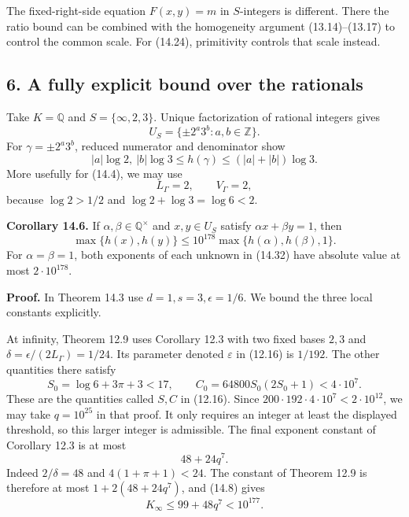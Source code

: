 \documentclass[
  11pt,
  a4paper,
]{article}
\begin{document}
The fixed-right-side equation \(F(x,y)=m\) in \(S\)-integers is
different. There the ratio bound can be combined with the homogeneity
argument (13.14)--(13.17) to control the common scale. For (14.24),
primitivity controls that scale instead.

\subsection{6. A fully explicit bound over the
rationals}\label{a-fully-explicit-bound-over-the-rationals}

Take \(K=\mathbb Q\) and \(S=\{\infty,2,3\}\). Unique factorization of
rational integers gives \[
U_S=\{\pm2^a3^b:a,b\in\mathbb Z\}.
\tag{14.32}
\] For \(\gamma=\pm2^a3^b\), reduced numerator and denominator show \[
|a|\log2,\ |b|\log3\le h(\gamma)
 \le(|a|+|b|)\log3.
\] More usefully for (14.4), we may use \[
L_\Gamma=2,\qquad V_\Gamma=2,
\tag{14.33}
\] because \(\log2>1/2\) and \(\log2+\log3=\log6<2\).

\textbf{Corollary 14.6.} If \(\alpha,\beta\in\mathbb Q^\times\) and
\(x,y\in U_S\) satisfy \(\alpha x+\beta y=1\), then \[
\max\{h(x),h(y)\}\le
10^{178}\max\{h(\alpha),h(\beta),1\}.
\tag{14.34}
\] For \(\alpha=\beta=1\), both exponents of each unknown in (14.32)
have absolute value at most \(2\cdot10^{178}\).

\textbf{Proof.} In Theorem 14.3 use \(d=1,s=3,\epsilon=1/6\). We bound
the three local constants explicitly.

At infinity, Theorem 12.9 uses Corollary 12.3 with two fixed bases
\(2,3\) and \(\delta=\epsilon/(2L_\Gamma)=1/24\). Its parameter denoted
\(\varepsilon\) in (12.16) is \(1/192\). The other quantities there
satisfy \[
S_0=\log6+3\pi+3<17,\qquad
C_0=64800S_0(2S_0+1)<4\cdot10^7.
\tag{14.35}
\] These are the quantities called \(S,C\) in (12.16). Since
\(200\cdot192\cdot4\cdot10^7<2\cdot10^{12}\), we may take \(q=10^{25}\)
in that proof. It only requires an integer at least the displayed
threshold, so this larger integer is admissible. The final exponent
constant of Corollary 12.3 is at most \[
48+24q^7.
\tag{14.36}
\] Indeed \(2/\delta=48\) and \(4(1+\pi+1)<24\). The constant of Theorem
12.9 is therefore at most \(1+2(48+24q^7)\), and (14.8) gives \[
K_\infty\le99+48q^7<10^{177}.
\tag{14.37}
\]
\end{document}
